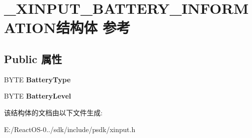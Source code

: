 \hypertarget{struct___x_i_n_p_u_t___b_a_t_t_e_r_y___i_n_f_o_r_m_a_t_i_o_n}{}\section{\+\_\+\+X\+I\+N\+P\+U\+T\+\_\+\+B\+A\+T\+T\+E\+R\+Y\+\_\+\+I\+N\+F\+O\+R\+M\+A\+T\+I\+O\+N结构体 参考}
\label{struct___x_i_n_p_u_t___b_a_t_t_e_r_y___i_n_f_o_r_m_a_t_i_o_n}
\subsection*{Public 属性}
\begin{DoxyCompactItemize}
\item 
\mbox{\label{struct___x_i_n_p_u_t___b_a_t_t_e_r_y___i_n_f_o_r_m_a_t_i_o_n_a4b2dca8424bb237f4f4c68a93d4225ca}} 
B\+Y\+TE {\bfseries Battery\+Type}
\item 
\mbox{\label{struct___x_i_n_p_u_t___b_a_t_t_e_r_y___i_n_f_o_r_m_a_t_i_o_n_a2fed4d1573d0b38752d32b0d3666259d}} 
B\+Y\+TE {\bfseries Battery\+Level}
\end{DoxyCompactItemize}


该结构体的文档由以下文件生成\+:\begin{DoxyCompactItemize}
\item 
E\+:/\+React\+O\+S-\/0../sdk/include/psdk/xinput.\+h\end{DoxyCompactItemize}
